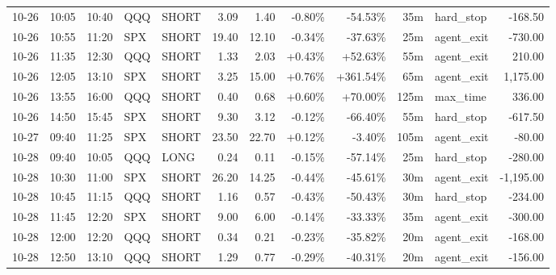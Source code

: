 \documentclass[11pt,a4paper,twoside]{article}
\begin{document}
\begin{center}
\begin{longtable}{>{\color{txtmain}}l l l l l r r r r r >{\color{txtmain}}l r}
10-26 & 10:05 & 10:40 & QQQ & SHORT & 3.09 & 1.40 & \textcolor{lossred}{-0.80\%} & \textcolor{lossred}{-54.53\%} & 35m & hard\_stop & \textcolor{lossred}{-168.50} \\
10-26 & 10:55 & 11:20 & SPX & SHORT & 19.40 & 12.10 & \textcolor{lossred}{-0.34\%} & \textcolor{lossred}{-37.63\%} & 25m & agent\_exit & \textcolor{lossred}{-730.00} \\
10-26 & 11:35 & 12:30 & QQQ & SHORT & 1.33 & 2.03 & \textcolor{wingreen}{+0.43\%} & \textcolor{wingreen}{+52.63\%} & 55m & agent\_exit & \textcolor{wingreen}{210.00} \\
10-26 & 12:05 & 13:10 & SPX & SHORT & 3.25 & 15.00 & \textcolor{wingreen}{+0.76\%} & \textcolor{wingreen}{+361.54\%} & 65m & agent\_exit & \textcolor{wingreen}{1,175.00} \\
10-26 & 13:55 & 16:00 & QQQ & SHORT & 0.40 & 0.68 & \textcolor{wingreen}{+0.60\%} & \textcolor{wingreen}{+70.00\%} & 125m & max\_time & \textcolor{wingreen}{336.00} \\
10-26 & 14:50 & 15:45 & SPX & SHORT & 9.30 & 3.12 & \textcolor{lossred}{-0.12\%} & \textcolor{lossred}{-66.40\%} & 55m & hard\_stop & \textcolor{lossred}{-617.50} \\
10-27 & 09:40 & 11:25 & SPX & SHORT & 23.50 & 22.70 & \textcolor{wingreen}{+0.12\%} & \textcolor{lossred}{-3.40\%} & 105m & agent\_exit & \textcolor{lossred}{-80.00} \\
10-28 & 09:40 & 10:05 & QQQ & LONG & 0.24 & 0.11 & \textcolor{lossred}{-0.15\%} & \textcolor{lossred}{-57.14\%} & 25m & hard\_stop & \textcolor{lossred}{-280.00} \\
10-28 & 10:30 & 11:00 & SPX & SHORT & 26.20 & 14.25 & \textcolor{lossred}{-0.44\%} & \textcolor{lossred}{-45.61\%} & 30m & agent\_exit & \textcolor{lossred}{-1,195.00} \\
10-28 & 10:45 & 11:15 & QQQ & SHORT & 1.16 & 0.57 & \textcolor{lossred}{-0.43\%} & \textcolor{lossred}{-50.43\%} & 30m & hard\_stop & \textcolor{lossred}{-234.00} \\
10-28 & 11:45 & 12:20 & SPX & SHORT & 9.00 & 6.00 & \textcolor{lossred}{-0.14\%} & \textcolor{lossred}{-33.33\%} & 35m & agent\_exit & \textcolor{lossred}{-300.00} \\
10-28 & 12:00 & 12:20 & QQQ & SHORT & 0.34 & 0.21 & \textcolor{lossred}{-0.23\%} & \textcolor{lossred}{-35.82\%} & 20m & agent\_exit & \textcolor{lossred}{-168.00} \\
10-28 & 12:50 & 13:10 & QQQ & SHORT & 1.29 & 0.77 & \textcolor{lossred}{-0.29\%} & \textcolor{lossred}{-40.31\%} & 20m & agent\_exit & \textcolor{lossred}{-156.00} \\

\end{longtable}
\end{center}
\end{document}
